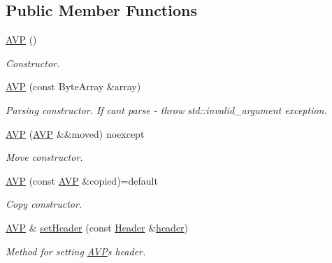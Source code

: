 \subsection*{Public Member Functions}
\begin{DoxyCompactItemize}
\item 
\mbox{\label{classDiameter_1_1AVP_a840ad7cf0c0b0b9f8d73f2ae3f65b436}} 
\hyperlink{classDiameter_1_1AVP_a840ad7cf0c0b0b9f8d73f2ae3f65b436}{A\+VP} ()
\begin{DoxyCompactList}\small\item\em Constructor. \end{DoxyCompactList}\item 
\hyperlink{classDiameter_1_1AVP_a8ff7f26ccb7c31a2342d9e1895cb5f36}{A\+VP} (const Byte\+Array \&array)
\begin{DoxyCompactList}\small\item\em Parsing constructor. If can\textquotesingle{}t parse -\/ throw std\+::invalid\+\_\+argument exception. \end{DoxyCompactList}\item 
\mbox{\label{classDiameter_1_1AVP_a24d6aa1295ec21d4e44f41be778d7a69}} 
\hyperlink{classDiameter_1_1AVP_a24d6aa1295ec21d4e44f41be778d7a69}{A\+VP} (\hyperlink{classDiameter_1_1AVP}{A\+VP} \&\&moved) noexcept
\begin{DoxyCompactList}\small\item\em Move constructor. \end{DoxyCompactList}\item 
\hyperlink{classDiameter_1_1AVP_a7af17a8ef8718185e3aef42031f47e90}{A\+VP} (const \hyperlink{classDiameter_1_1AVP}{A\+VP} \&copied)=default
\begin{DoxyCompactList}\small\item\em Copy constructor. \end{DoxyCompactList}\item 
\hyperlink{classDiameter_1_1AVP}{A\+VP} \& \hyperlink{classDiameter_1_1AVP_a1c275a3973c1d871e0653a1ab5c54499}{set\+Header} (const \hyperlink{classDiameter_1_1AVP_1_1Header}{Header} \&\hyperlink{classDiameter_1_1AVP_aa968a1e25c2b83df6ea774d67534320b}{header})
\begin{DoxyCompactList}\small\item\em Method for setting \hyperlink{classDiameter_1_1AVP}{A\+VP}\textquotesingle{}s header. \end{DoxyCompactList}\item 

\end{DoxyCompactItemize}
